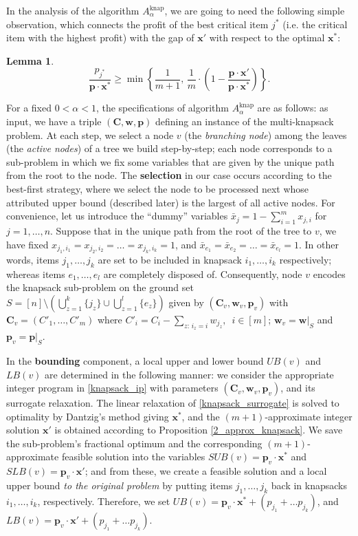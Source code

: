 \documentclass[moor,sglanonrev]{informs4}
\theoremstyle{plain}
\newtheorem{lmm}{Lemma}  %
\begin{document}
In the analysis of the algorithm $A^{\text{knap}}_{\alpha}$, we are going to need the following simple observation, which connects the profit of the best critical item $j^*$ (i.e. the critical item with the highest profit) with the gap of $\bm{x}'$ with respect to the optimal $\bm{x}^*$:

\begin{lmm}\label{knapsack_gap_and_critical_element}
     \[
     \frac{p_{j^*}}{\bm{p}\cdot \bm{x}^*} \ge \min\left\{\frac{1}{m+1}, \,\frac{1}{m} \cdot \left(1-\frac{\bm{p}\cdot \bm{x}'}{\bm{p}\cdot \bm{x}^*}\right)\right\}.
    \]
\end{lmm}

For a fixed $0 <\alpha < 1$,  the specifications of algorithm $A^{\text{knap}}_{\alpha}$ are as follows: as input, we have a triple $(\bm{C}, \bm{w}, \bm{p})$ defining an instance of the multi-knapsack problem. At each step, we select a node $v$ (the \emph{branching node}) among the leaves (the \emph{active nodes}) of a tree we build step-by-step; each node corresponds to a sub-problem in which we fix some variables that are given by the unique path from the root to the node. The \textbf{selection} in our case occurs according to the best-first strategy, where we select the node to be processed next whose attributed upper bound (described later) is the largest of all active nodes. For convenience, let us introduce the ``dummy'' variables $\bar{x}_j = 1-\sum\limits_{i=1}^m x_{j,i}$ for $j = 1, \ldots, n$. Suppose that in the unique path from the root of the tree to $v$, we have fixed $x_{j_1, i_1} = x_{j_2, i_2} = \ldots = x_{j_k, i_k} = 1$, and $\bar{x}_{e_1} = \bar{x}_{e_2} = \ldots = \bar{x}_{e_l}=1$. In other words, items $j_1, \ldots, j_k$ are set to be included in knapsack $i_1, \ldots, i_k$ respectively; whereas items $e_1, \ldots, e_l$ are completely disposed of. Consequently, node $v$ encodes the knapsack sub-problem on the ground set $S=[n]\setminus \left(\bigcup_{z=1}^k \{j_z\} \cup \bigcup_{z=1}^l \{e_z\}\right)$ given by $(\bm{C}_v, \bm{w}_v, \bm{p}_v)$ with $\bm{C}_v = (C'_1, \ldots, C'_m)$ where $C'_i = C_i-\sum\limits_{z:\, i_z = i} w_{j_z}, \,\,\, i \in [m]$; $\bm{w}_v=\bm{w}|_{S}$ and $\bm{p}_v=\bm{p}|_{S}$. 

In the \textbf{bounding} component, a local upper and lower bound $UB(v)$ and $LB(v)$ are determined in the following manner: we consider the appropriate integer program in \eqref{knapsack_ip} with parameters $(\bm{C}_v, \bm{w}_v, \bm{p}_v)$, and its surrogate relaxation. The linear relaxation of \eqref{knapsack_surrogate} is solved to optimality by Dantzig's method giving $\bm{x}^*$, and the $(m+1)$-approximate integer solution $\bm{x}'$ is obtained according to Proposition \ref{2_approx_knapsack}. We save the sub-problem's fractional optimum and the corresponding $(m+1)$-approximate feasible solution into the variables $SUB(v)=\bm{p}_v\cdot \bm{x}^*$ and $SLB(v)=\bm{p}_v\cdot \bm{x}'$; and from these, we create a feasible solution and a local upper bound \emph{to the original problem} by putting items $j_1, \ldots, j_k$ back in knapsacks $i_1, \ldots, i_k$, respectively. Therefore, we set $UB(v) = \bm{p}_v\cdot \bm{x}^* + (p_{j_1}+\ldots p_{j_k})$, and $LB(v)= \bm{p}_v\cdot \bm{x}' + (p_{j_1}+\ldots p_{j_k})$.
\end{document}
